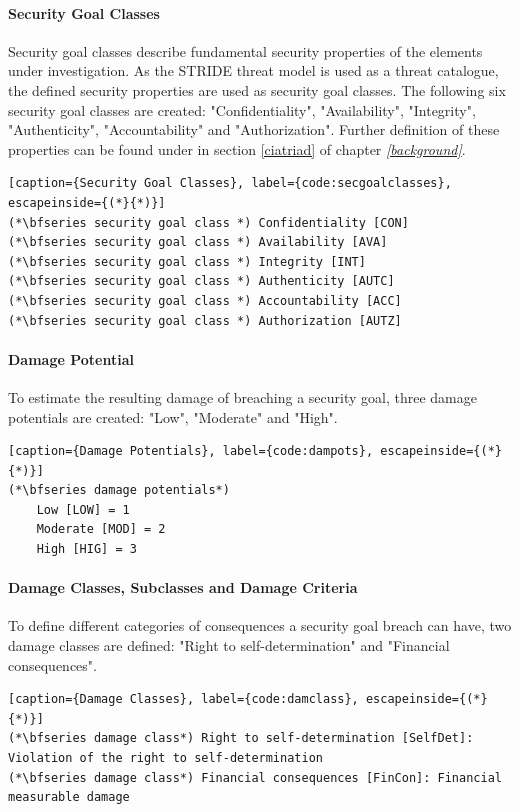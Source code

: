 \paragraph{Security Goal Classes} Security goal classes describe fundamental security properties of the elements under investigation. As the STRIDE threat model is used as a threat catalogue, the defined security properties are used as security goal classes. The following six security goal classes are created: "Confidentiality", "Availability", "Integrity", "Authenticity", "Accountability" and "Authorization". Further definition of these properties can be found under in section \ref{ciatriad} of chapter \textit{\ref{background}}.


\begin{lstlisting}[caption={Security Goal Classes}, label={code:secgoalclasses}, escapeinside={(*}{*)}]
(*\bfseries security goal class *) Confidentiality [CON]
(*\bfseries security goal class *) Availability [AVA]
(*\bfseries security goal class *) Integrity [INT]
(*\bfseries security goal class *) Authenticity [AUTC]
(*\bfseries security goal class *) Accountability [ACC]
(*\bfseries security goal class *) Authorization [AUTZ]
\end{lstlisting}


\paragraph{Damage Potential} To estimate the resulting damage of breaching a security goal, three damage potentials are created: "Low", "Moderate" and "High".


\begin{lstlisting}[caption={Damage Potentials}, label={code:dampots}, escapeinside={(*}{*)}]
(*\bfseries damage potentials*)
    Low [LOW] = 1
    Moderate [MOD] = 2
    High [HIG] = 3
\end{lstlisting}

\paragraph{Damage Classes, Subclasses and Damage Criteria} To define different categories of consequences a security goal breach can have, two damage classes are defined: "Right to self-determination" and "Financial consequences". \\

\begin{lstlisting}[caption={Damage Classes}, label={code:damclass}, escapeinside={(*}{*)}]
(*\bfseries damage class*) Right to self-determination [SelfDet]: Violation of the right to self-determination
(*\bfseries damage class*) Financial consequences [FinCon]: Financial measurable damage
\end{lstlisting}


